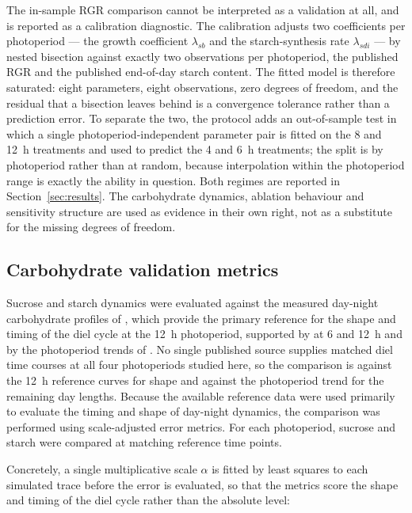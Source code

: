 \documentclass[a4paper,fleqn]{cas-sc}
\begin{document}
The in-sample RGR comparison cannot be interpreted as a validation at all,
and is reported as a calibration diagnostic. The calibration adjusts two
coefficients per photoperiod --- the growth coefficient $\lambda_{sb}$ and
the starch-synthesis rate $\lambda_{sdi}$ --- by nested bisection against
exactly two observations per photoperiod, the published RGR and the published
end-of-day starch content. The fitted model is therefore saturated: eight
parameters, eight observations, zero degrees of freedom, and the residual
that a bisection leaves behind is a convergence tolerance rather than a
prediction error. To separate the two, the protocol adds an out-of-sample
test in which a single photoperiod-independent parameter pair is fitted on
the 8 and 12~h treatments and used to predict the 4 and 6~h treatments; the
split is by photoperiod rather than at random, because interpolation within
the photoperiod range is exactly the ability in question. Both regimes are
reported in Section~\ref{sec:results}. The carbohydrate dynamics, ablation
behaviour and sensitivity structure are used as evidence in their own right,
not as a substitute for the missing degrees of freedom.

\subsection{Carbohydrate validation metrics}
\label{sec:carbohydrate_metrics}

Sucrose and starch dynamics were evaluated against the measured day-night
carbohydrate profiles of \citet{Annunziata2017}, which provide the primary
reference for the shape and timing of the diel cycle at the 12~h photoperiod,
supported by \citet{Mengin2017} at 6 and 12~h and by the photoperiod trends of
\citet{Sulpice2014}. No single published source supplies matched diel time
courses at all four photoperiods studied here, so the comparison is against the
12~h reference curves for shape and against the photoperiod trend for the
remaining day lengths. Because the available reference data were
used primarily to evaluate the timing and shape of day-night dynamics, the
comparison was performed using scale-adjusted error metrics. For each
photoperiod, sucrose and starch were compared at matching reference time
points.

Concretely, a single multiplicative scale $\alpha$ is fitted by least squares
to each simulated trace before the error is evaluated, so that the metrics
score the shape and timing of the diel cycle rather than the absolute level:
\end{document}
